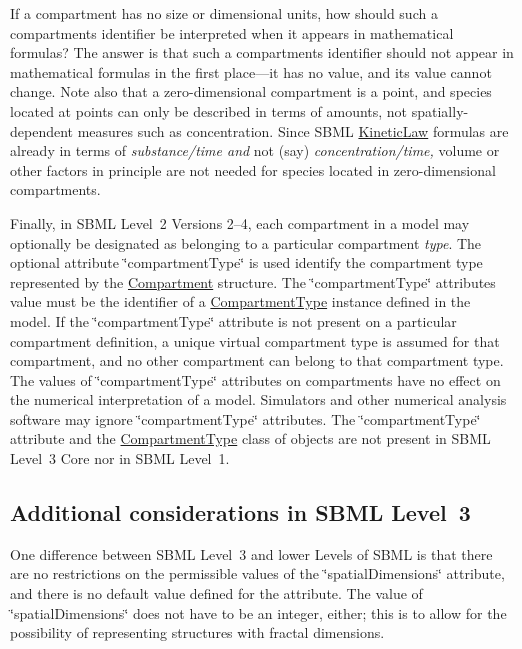 If a compartment has no size or dimensional units, how should such a compartment\textquotesingle{}s identifier be interpreted when it appears in mathematical formulas? The answer is that such a compartment\textquotesingle{}s identifier should not appear in mathematical formulas in the first place---it has no value, and its value cannot change. Note also that a zero-\/dimensional compartment is a point, and species located at points can only be described in terms of amounts, not spatially-\/dependent measures such as concentration. Since S\+B\+ML \hyperlink{class_kinetic_law}{Kinetic\+Law} formulas are already in terms of {\itshape substance/{\itshape time} and} not (say) {\itshape concentration/{\itshape time},} volume or other factors in principle are not needed for species located in zero-\/dimensional compartments.

Finally, in S\+B\+ML Level~2 Versions 2--4, each compartment in a model may optionally be designated as belonging to a particular compartment {\itshape type}. The optional attribute \char`\"{}compartment\+Type\char`\"{} is used identify the compartment type represented by the \hyperlink{class_compartment}{Compartment} structure. The \char`\"{}compartment\+Type\char`\"{} attribute\textquotesingle{}s value must be the identifier of a \hyperlink{class_compartment_type}{Compartment\+Type} instance defined in the model. If the \char`\"{}compartment\+Type\char`\"{} attribute is not present on a particular compartment definition, a unique virtual compartment type is assumed for that compartment, and no other compartment can belong to that compartment type. The values of \char`\"{}compartment\+Type\char`\"{} attributes on compartments have no effect on the numerical interpretation of a model. Simulators and other numerical analysis software may ignore \char`\"{}compartment\+Type\char`\"{} attributes. The \char`\"{}compartment\+Type\char`\"{} attribute and the \hyperlink{class_compartment_type}{Compartment\+Type} class of objects are not present in S\+B\+ML Level~3 Core nor in S\+B\+ML Level~1.\hypertarget{class_compartment_comp-l3}{}\subsection{Additional considerations in S\+B\+M\+L Level 3}\label{class_compartment_comp-l3}
One difference between S\+B\+ML Level~3 and lower Levels of S\+B\+ML is that there are no restrictions on the permissible values of the \char`\"{}spatial\+Dimensions\char`\"{} attribute, and there is no default value defined for the attribute. The value of \char`\"{}spatial\+Dimensions\char`\"{} does not have to be an integer, either; this is to allow for the possibility of representing structures with fractal dimensions.


